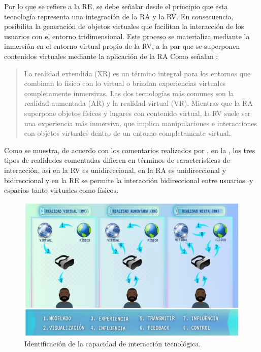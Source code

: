 \documentclass[spanish]{textolivre}
\begin{document}
Por lo que se refiere a la RE, se debe señalar desde el principio que esta tecnología representa una integración de la RA y la RV. En consecuencia, posibilita la generación de objetos virtuales que facilitan la interacción de los usuarios con el entorno tridimensional. Este proceso se materializa mediante la inmersión en el entorno virtual propio de la RV, a la par que se superponen contenidos virtuales mediante la aplicación de la RA
Como señalan \textcite[p.~29]{brown_2020}: 

\begin{quote}
La realidad extendida (XR) es un término integral para los entornos que combinan lo físico con lo virtual o brindan experiencias virtuales completamente inmersivas. Las dos tecnologías más comunes son la realidad aumentada (AR) y la realidad virtual (VR). Mientras que la RA superpone objetos físicos y lugares con contenido virtual, la RV suele ser una experiencia más inmersiva, que implica manipulaciones e interacciones con objetos virtuales dentro de un entorno completamente virtual.
\end{quote}


Como se muestra, de acuerdo con los comentarios realizados por \textcite{wang2023application}, en la , los tres tipos de realidades comentadas difieren en términos de características de interacción, así en la RV es unidireccional, en la RA es unidireccional y bidireccional y en la RE se permite la interacción bidireccional entre usuarios. y espacios tanto virtuales como físicos.

\begin{figure}
\centering
\begin{minipage}{.85\textwidth}
\includegraphics[width=\linewidth]{Fig2.png}
\caption{Identificación de la capacidad de interacción tecnológica.}
\label{fig2}
\end{minipage}
\end{figure}
 
\end{document}
